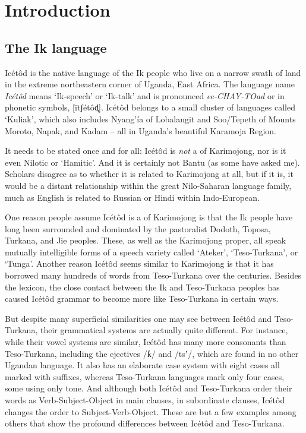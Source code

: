 \chapter{Introduction}\label{sec:1}
\section{The Ik language}\label{sec:1.1}  
Icétôd is the native language of the Ik people who live on a narrow swath of land in the extreme northeastern corner of Uganda, East Africa. The language name \textit{Icétôd} means ‘Ik-speech’ or ‘Ik-talk’ and is pronounced \textit{ee-CHAY-TOad} or in phonetic symbols, [\={i}tʃétôd̻]. Icétôd belongs to a small cluster of languages called ‘Kuliak’, which also includes Nyang’ía of Lobalangit and Soo/Tepeth of Mounts Moroto, Napak, and Kadam – all in Uganda’s beautiful Karamoja Region. 

It needs to be stated once and for all: Icétôd is \textit{not }a  of Karimojong, nor is it even Nilotic or ‘Hamitic’. And it is certainly not Bantu (as some have asked me). Scholars disagree as to whether it is related to Karimojong at all, but if it is, it would be a distant relationship within the great Nilo-Saharan language family, much as English is related to Russian or Hindi within Indo-European.

One reason people assume Icétôd is a  of Karimojong is that the Ik people have long been surrounded and dominated by the pastoralist Dodoth, Toposa, Turkana, and Jie peoples. These, as well as the Karimojong proper, all speak mutually intelligible forms of a speech variety called ‘Ateker’, ‘Teso-Turkana’, or ‘Tunga’. Another reason Icétôd seems similar to Karimojong is that it has borrowed many hundreds of words from Teso-Turkana over the centuries. Besides the lexicon, the close contact between the Ik and Teso-Turkana peoples has caused Icétôd grammar to become more like Teso-Turkana in certain ways.

But despite many superficial similarities one may see between Icétôd and Teso-Turkana, their grammatical systems are actually quite different. For instance, while their vowel systems are similar, Icétôd has many more consonants than Teso-Turkana, including the ejectives /ƙ/ and /tsʼ/, which are found in no other Ugandan language. It also has an elaborate case system with eight cases all marked with suffixes, whereas Teso-Turkana languages mark only four cases, some using only tone. And although both Icétôd and Teso-Turkana order their words as Verb-Subject-Object in main clauses, in subordinate clauses, Icétôd changes the order to Subject-Verb-Object. These are but a few examples among others that show the profound differences between Icétôd and Teso-Turkana.

